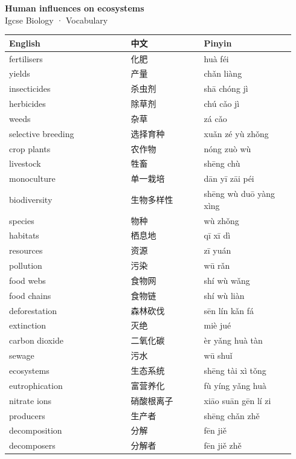 \documentclass[11pt]{article}
\begin{document}
\begin{center}
  {\LARGE\bfseries Human influences on ecosystems}\\[0.35em]
  {\large Igcse Biology · Vocabulary}
\end{center}
\vspace{0.6em}

\begin{longtable}{@{}p{0.40\linewidth}p{0.24\linewidth}p{0.30\linewidth}@{}}
\toprule
\textbf{English} & \textbf{中文} & \textbf{Pinyin} \\
\midrule
\endhead
\bottomrule
\endlastfoot
fertilisers & 化肥 & huà féi \\
yields & 产量 & chǎn liàng \\
insecticides & 杀虫剂 & shā chóng jì \\
herbicides & 除草剂 & chú cǎo jì \\
weeds & 杂草 & zá cǎo \\
selective breeding & 选择育种 & xuǎn zé yù zhǒng \\
crop plants & 农作物 & nóng zuò wù \\
livestock & 牲畜 & shēng chù \\
monoculture & 单一栽培 & dān yī zāi péi \\
biodiversity & 生物多样性 & shēng wù duō yàng xìng \\
species & 物种 & wù zhǒng \\
habitats & 栖息地 & qī xī dì \\
resources & 资源 & zī yuán \\
pollution & 污染 & wū rǎn \\
food webs & 食物网 & shí wù wǎng \\
food chains & 食物链 & shí wù liàn \\
deforestation & 森林砍伐 & sēn lín kǎn fá \\
extinction & 灭绝 & miè jué \\
carbon dioxide & 二氧化碳 & èr yǎng huà tàn \\
sewage & 污水 & wū shuǐ \\
ecosystems & 生态系统 & shēng tài xì tǒng \\
eutrophication & 富营养化 & fù yíng yǎng huà \\
nitrate ions & 硝酸根离子 & xiāo suān gēn lí zi \\
producers & 生产者 & shēng chǎn zhě \\
decomposition & 分解 & fēn jiě \\
decomposers & 分解者 & fēn jiě zhě \\

\end{longtable}
\end{document}
